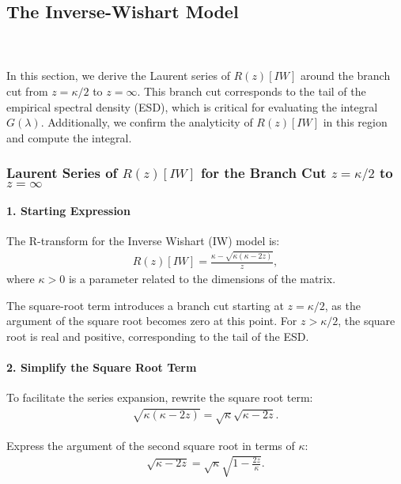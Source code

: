 \subsection{The Inverse-Wishart Model}
\label{sxn:IW}

\\
\\
In this section, we derive the Laurent series of $R(z)[IW]$ around the branch cut from $z = \kappa/2$ to $z = \infty$. This branch cut corresponds to the tail of the empirical spectral density (ESD), which is critical for evaluating the integral $G(\lambda)$. Additionally, we confirm the analyticity of $R(z)[IW]$ in this region and compute the integral.

\subsubsection{Laurent Series of $R(z)[IW]$ for the Branch Cut $z = \kappa/2$ to $z = \infty$}
\paragraph{1. Starting Expression}

The R-transform for the Inverse Wishart (IW) model is:
\begin{align}
R(z)[IW] = \frac{\kappa - \sqrt{\kappa(\kappa - 2z)}}{z},
\end{align}
where $\kappa > 0$ is a parameter related to the dimensions of the matrix.

The square-root term introduces a branch cut starting at $z = \kappa/2$, as the argument of the square root becomes zero at this point. For $z > \kappa/2$, the square root is real and positive, corresponding to the tail of the ESD.

\paragraph{2. Simplify the Square Root Term}

To facilitate the series expansion, rewrite the square root term:
\begin{align}
\sqrt{\kappa(\kappa - 2z)} = \sqrt{\kappa} \sqrt{\kappa - 2z}.
\end{align}

Express the argument of the second square root in terms of $\kappa$:
\begin{align}
\sqrt{\kappa - 2z} = \sqrt{\kappa} \sqrt{1 - \frac{2z}{\kappa}}.
\end{align}

